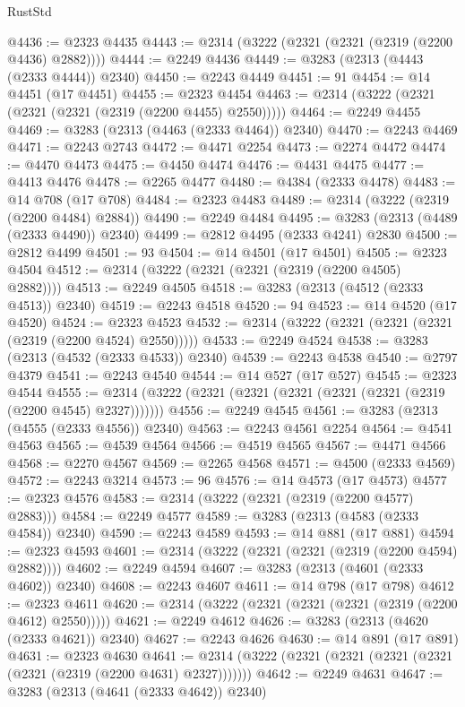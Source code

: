 \begin{lexlean}{RustStd}
\begin{coremodule}
@4436 := @2323 @4435
@4443 := @2314 (@3222 (@2321 (@2321 (@2319 (@2200 @4436) @2882))))
@4444 := @2249 @4436
@4449 := @3283 (@2313 (@4443 (@2333 @4444)) @2340)
@4450 := @2243 @4449
@4451 := 91
@4454 := @14 @4451 (@17 @4451)
@4455 := @2323 @4454
@4463 := @2314 (@3222 (@2321 (@2321 (@2321 (@2319 (@2200 @4455) @2550)))))
@4464 := @2249 @4455
@4469 := @3283 (@2313 (@4463 (@2333 @4464)) @2340)
@4470 := @2243 @4469
@4471 := @2243 @2743
@4472 := @4471 @2254
@4473 := @2274 @4472
@4474 := @4470 @4473
@4475 := @4450 @4474
@4476 := @4431 @4475
@4477 := @4413 @4476
@4478 := @2265 @4477
@4480 := @4384 (@2333 @4478)
@4483 := @14 @708 (@17 @708)
@4484 := @2323 @4483
@4489 := @2314 (@3222 (@2319 (@2200 @4484) @2884))
@4490 := @2249 @4484
@4495 := @3283 (@2313 (@4489 (@2333 @4490)) @2340)
@4499 := @2812 @4495 (@2333 @4241) @2830
@4500 := @2812 @4499
@4501 := 93
@4504 := @14 @4501 (@17 @4501)
@4505 := @2323 @4504
@4512 := @2314 (@3222 (@2321 (@2321 (@2319 (@2200 @4505) @2882))))
@4513 := @2249 @4505
@4518 := @3283 (@2313 (@4512 (@2333 @4513)) @2340)
@4519 := @2243 @4518
@4520 := 94
@4523 := @14 @4520 (@17 @4520)
@4524 := @2323 @4523
@4532 := @2314 (@3222 (@2321 (@2321 (@2321 (@2319 (@2200 @4524) @2550)))))
@4533 := @2249 @4524
@4538 := @3283 (@2313 (@4532 (@2333 @4533)) @2340)
@4539 := @2243 @4538
@4540 := @2797 @4379
@4541 := @2243 @4540
@4544 := @14 @527 (@17 @527)
@4545 := @2323 @4544
@4555 := @2314 (@3222 (@2321 (@2321 (@2321 (@2321 (@2321 (@2319 (@2200 @4545) @2327)))))))
@4556 := @2249 @4545
@4561 := @3283 (@2313 (@4555 (@2333 @4556)) @2340)
@4563 := @2243 @4561 @2254
@4564 := @4541 @4563
@4565 := @4539 @4564
@4566 := @4519 @4565
@4567 := @4471 @4566
@4568 := @2270 @4567
@4569 := @2265 @4568
@4571 := @4500 (@2333 @4569)
@4572 := @2243 @3214
@4573 := 96
@4576 := @14 @4573 (@17 @4573)
@4577 := @2323 @4576
@4583 := @2314 (@3222 (@2321 (@2319 (@2200 @4577) @2883)))
@4584 := @2249 @4577
@4589 := @3283 (@2313 (@4583 (@2333 @4584)) @2340)
@4590 := @2243 @4589
@4593 := @14 @881 (@17 @881)
@4594 := @2323 @4593
@4601 := @2314 (@3222 (@2321 (@2321 (@2319 (@2200 @4594) @2882))))
@4602 := @2249 @4594
@4607 := @3283 (@2313 (@4601 (@2333 @4602)) @2340)
@4608 := @2243 @4607
@4611 := @14 @798 (@17 @798)
@4612 := @2323 @4611
@4620 := @2314 (@3222 (@2321 (@2321 (@2321 (@2319 (@2200 @4612) @2550)))))
@4621 := @2249 @4612
@4626 := @3283 (@2313 (@4620 (@2333 @4621)) @2340)
@4627 := @2243 @4626
@4630 := @14 @891 (@17 @891)
@4631 := @2323 @4630
@4641 := @2314 (@3222 (@2321 (@2321 (@2321 (@2321 (@2321 (@2319 (@2200 @4631) @2327)))))))
@4642 := @2249 @4631
@4647 := @3283 (@2313 (@4641 (@2333 @4642)) @2340)

\end{coremodule}
\end{lexlean}
